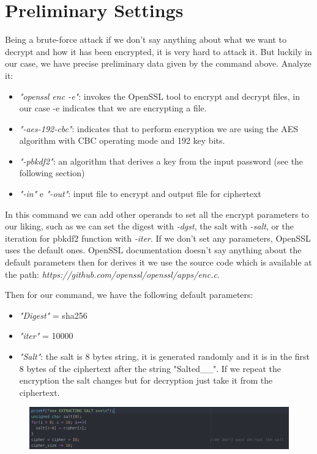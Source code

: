 \documentclass[11pt]{article}
\begin{document}
\section{Preliminary Settings}
Being a brute-force attack if we don't say anything about what we want to decrypt and how it has been encrypted, it is very hard to attack it. But luckily in our case, we have precise preliminary data given by the command above. Analyze it:

\begin{itemize}
\item {\em "openssl enc -e"}: invokes the OpenSSL tool to encrypt and decrypt files, in our case -e indicates that we are encrypting a file.
\item {\em "-aes-192-cbc"}: indicates that to perform encryption we are using the AES algorithm with CBC operating mode and 192 key bits.
\item {\em "-pbkdf2"}: an algorithm that derives a key from the input password (see the following section)
\item {\em "-in"} e {\em "-out"}: input file to encrypt and output file for ciphertext
\end{itemize}

In this command we can add other operands to set all the encrypt parameters to our liking, such as we can set the digest with {\em -dgst}, the salt with {\em -salt}, or the iteration for pbkdf2 function with {\em -iter}. If we don't set any parameters, OpenSSL uses the default ones. OpenSSL documentation doesn't say anything about the default parameters then for derives it we use the source code which is available at the path: {\em https://github.com/openssl/openssl/apps/enc.c}.

Then for our command, we have the following default parameters:
\begin{itemize}
\item {\em "Digest"} = sha256
\item {\em "iter"} = 10000
\item {\em "Salt"}: the salt is 8 bytes string, it is generated randomly and it is in the first 8 bytes of the ciphertext after the string "Salted\_\_". If we repeat the encryption the salt changes but for decryption just take it from the ciphertext.
\end{itemize}

\begin{figure}[!ht]
 \includegraphics[width=1\textwidth]{pic1-hw2-1635747}
 \label{fig:Salt extraction}
\end{figure}
\end{document}
